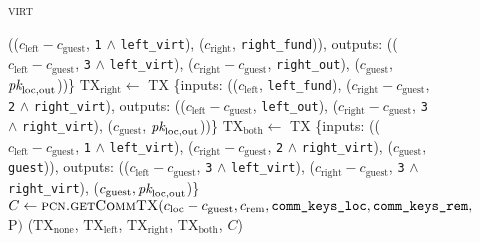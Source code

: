 \begin{figure}[H]
\begin{processbox}{\textsc{virt}}
\begin{algorithmic}[1]
        (($c_{\mathrm{left}} - c_{\mathrm{guest}}$, \texttt{1} $\wedge$
        \texttt{left\_virt}), ($c_{\mathrm{right}}$, \texttt{right\_fund})),
        outputs: (($c_{\mathrm{left}} - c_{\mathrm{guest}}$, \texttt{3} $\wedge$
        \texttt{left\_virt}), ($c_{\mathrm{right}} - c_{\mathrm{guest}}$,
        \texttt{right\_out}), ($c_{\mathrm{guest}}$, $\textit{pk}_{\mathrm{loc},
        \mathrm{out}}$))\}
        \State $\mathrm{TX}_{\mathrm{right}} \gets$ TX \{inputs:
        (($c_{\mathrm{left}}$, \texttt{left\_fund}), ($c_{\mathrm{right}} -
        c_{\mathrm{guest}}$, \texttt{2} $\wedge$ \texttt{right\_virt}), outputs:
        (($c_{\mathrm{left}} - c_{\mathrm{guest}}$, \texttt{left\_out}),
        ($c_{\mathrm{right}} - c_{\mathrm{guest}}$, \texttt{3} $\wedge$
        \texttt{right\_virt}), ($c_{\mathrm{guest}}$, $\textit{pk}_{\mathrm{loc},
        \mathrm{out}}$))\}
        \State $\mathrm{TX}_{\mathrm{both}} \gets$ TX \{inputs:
        (($c_{\mathrm{left}} - c_{\mathrm{guest}}$, \texttt{1} $\wedge$
        \texttt{left\_virt}), ($c_{\mathrm{right}} - c_{\mathrm{guest}}$,
        \texttt{2} $\wedge$ \texttt{right\_virt}), ($c_{\mathrm{guest}}$,
        \texttt{guest})), outputs: (($c_{\mathrm{left}} - c_{\mathrm{guest}}$,
        \texttt{3} $\wedge$ \texttt{left\_virt}), ($c_{\mathrm{right}} -
        c_{\mathrm{guest}}$, \texttt{3} $\wedge$ \texttt{right\_virt}),
        ($c_{\mathrm{guest}}, \textit{pk}_{\mathrm{loc}, \mathrm{out}}$)\}
        \State $C \gets \textsc{pcn.getCommTX}(c_{\mathrm{loc}} -
        c_{\mathrm{guest}}, c_{\mathrm{rem}}, \texttt{comm\_keys\_loc},
        \texttt{comm\_keys\_rem}, $P$)$
        \State \Return ($\mathrm{TX}_{\mathrm{none}}$,
        $\mathrm{TX}_{\mathrm{left}}$, $\mathrm{TX}_{\mathrm{right}}$,
        $\mathrm{TX}_{\mathrm{both}}$, $C$)
      \EndIndent
    \end{algorithmic}
  \end{processbox}
  \caption{}
  \label{code:virtual-layer:mid-txs}
\end{figure}

